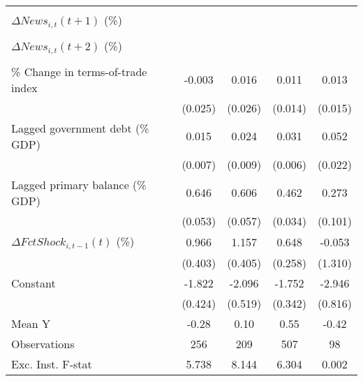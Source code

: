 {\begin{tabular}{l*{4}{c}}
                    &                     &                     &                     &                     \\
\addlinespace
$ \Delta News_{i,t}(t+1)$ (\%)&                     &                     &                     &                     \\
                    &                     &                     &                     &                     \\
\addlinespace
$ \Delta News_{i,t}(t+2)$ (\%)&                     &                     &                     &                     \\
                    &                     &                     &                     &                     \\
\addlinespace
\% Change in terms-of-trade index&      -0.003         &       0.016         &       0.011         &       0.013         \\
                    &     (0.025)         &     (0.026)         &     (0.014)         &     (0.015)         \\
\addlinespace
Lagged government debt (\% GDP)&       0.015\sym{*}  &       0.024\sym{**} &       0.031\sym{***}&       0.052\sym{**} \\
                    &     (0.007)         &     (0.009)         &     (0.006)         &     (0.022)         \\
\addlinespace
Lagged primary balance (\% GDP)&       0.646\sym{***}&       0.606\sym{***}&       0.462\sym{***}&       0.273\sym{**} \\
                    &     (0.053)         &     (0.057)         &     (0.034)         &     (0.101)         \\
\addlinespace
$ \Delta FctShock_{i,t-1}(t)$ (\%)&       0.966\sym{**} &       1.157\sym{**} &       0.648\sym{**} &      -0.053         \\
                    &     (0.403)         &     (0.405)         &     (0.258)         &     (1.310)         \\
\addlinespace
Constant            &      -1.822\sym{***}&      -2.096\sym{***}&      -1.752\sym{***}&      -2.946\sym{***}\\
                    &     (0.424)         &     (0.519)         &     (0.342)         &     (0.816)         \\
\midrule
Mean Y              &       -0.28         &        0.10         &        0.55         &       -0.42         \\
Observations        &         256         &         209         &         507         &          98         \\
Exc. Inst. F-stat   &       5.738         &       8.144         &       6.304         &       0.002         \\
\bottomrule
\end{tabular}
}
